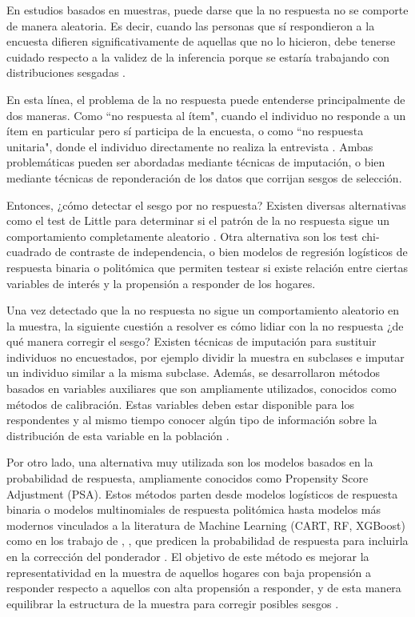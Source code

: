 \documentclass{article}
\begin{document}
En estudios basados en muestras, puede darse que la no respuesta no se comporte de manera aleatoria. Es decir, cuando las personas que sí respondieron a la encuesta difieren significativamente de aquellas que no lo hicieron, debe tenerse cuidado respecto a la validez de la inferencia porque se estaría trabajando con distribuciones sesgadas \cite{wmethods}.

En esta línea, el problema de la no respuesta puede entenderse principalmente de dos maneras. Como ``no respuesta al ítem", cuando el individuo no responde a un ítem en particular pero sí participa de la encuesta, o como ``no respuesta unitaria", donde el individuo directamente no realiza la entrevista \cite{korinek07}. Ambas problemáticas pueden ser abordadas mediante técnicas de imputación, o bien mediante técnicas de reponderación de los datos que corrijan sesgos de selección.

Entonces, ¿cómo detectar el sesgo por no respuesta? Existen diversas alternativas como el test de Little para determinar si el patrón de la no respuesta sigue un comportamiento completamente aleatorio \cite{tesisgonz}. Otra alternativa son los test chi-cuadrado de contraste de independencia, o bien modelos de regresión logísticos de respuesta binaria o politómica que permiten testear si existe relación entre ciertas variables de interés y la propensión a responder de los hogares.

Una vez detectado que la no respuesta no sigue un comportamiento aleatorio en la muestra, la siguiente cuestión a resolver es cómo lidiar con la no respuesta ¿de qué manera corregir el sesgo? Existen técnicas de imputación para sustituir individuos no encuestados, por ejemplo dividir la muestra en subclases e imputar un individuo similar a la misma subclase. Además, se desarrollaron métodos basados en variables auxiliares que son ampliamente utilizados, conocidos como métodos de calibración. Estas variables deben estar disponible para los respondentes y al mismo tiempo conocer algún tipo de información sobre la distribución de esta variable en la población \cite{handbook} \cite{psa_calib_onlinesv}.

Por otro lado, una alternativa muy utilizada son los modelos basados en la probabilidad de respuesta, ampliamente conocidos como Propensity Score Adjustment (PSA). Estos métodos parten desde modelos logísticos de respuesta binaria o modelos multinomiales de respuesta politómica  hasta modelos más modernos vinculados a la literatura de Machine Learning (CART, RF, XGBoost) como en los trabajo de \cite{methodsml}, \cite{methodsml_medicine}, \cite{methodsml_3} que predicen la probabilidad de respuesta para incluirla en la corrección del ponderador . El objetivo de este método es mejorar la representatividad en la muestra de aquellos hogares con baja propensión a responder respecto a aquellos con alta propensión a responder, y de esta manera equilibrar la estructura de la muestra para corregir posibles sesgos \cite{handbook}. 
\end{document}
